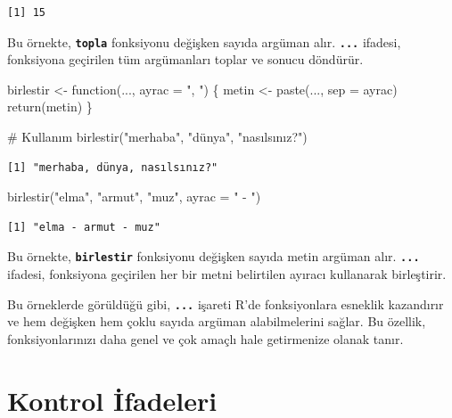 \documentclass[
  letterpaper,
  DIV=11,
  numbers=noendperiod]{scrreprt}
\newenvironment{Shaded}{\begin{snugshade}}{\end{snugshade}}
\newcommand{\AttributeTok}[1]{\textcolor[rgb]{0.40,0.45,0.13}{#1}}
\newcommand{\CommentTok}[1]{\textcolor[rgb]{0.37,0.37,0.37}{#1}}
\newcommand{\ControlFlowTok}[1]{\textcolor[rgb]{0.00,0.23,0.31}{#1}}
\newcommand{\FunctionTok}[1]{\textcolor[rgb]{0.28,0.35,0.67}{#1}}
\newcommand{\NormalTok}[1]{\textcolor[rgb]{0.00,0.23,0.31}{#1}}
\newcommand{\OtherTok}[1]{\textcolor[rgb]{0.00,0.23,0.31}{#1}}
\newcommand{\StringTok}[1]{\textcolor[rgb]{0.13,0.47,0.30}{#1}}
\begin{document}
\begin{verbatim}
[1] 15
\end{verbatim}

Bu örnekte, \textbf{\texttt{topla}} fonksiyonu değişken sayıda argüman
alır. \textbf{\texttt{...}} ifadesi, fonksiyona geçirilen tüm
argümanları toplar ve sonucu döndürür.

\begin{Shaded}
\begin{Highlighting}[]
\NormalTok{birlestir }\OtherTok{\textless{}{-}} \ControlFlowTok{function}\NormalTok{(..., }\AttributeTok{ayrac =} \StringTok{", "}\NormalTok{) \{}
\NormalTok{  metin }\OtherTok{\textless{}{-}} \FunctionTok{paste}\NormalTok{(..., }\AttributeTok{sep =}\NormalTok{ ayrac)}
  \FunctionTok{return}\NormalTok{(metin)}
\NormalTok{\}}

\CommentTok{\# Kullanım}
\FunctionTok{birlestir}\NormalTok{(}\StringTok{"merhaba"}\NormalTok{, }\StringTok{"dünya"}\NormalTok{, }\StringTok{"nasılsınız?"}\NormalTok{)  }
\end{Highlighting}
\end{Shaded}

\begin{verbatim}
[1] "merhaba, dünya, nasılsınız?"
\end{verbatim}

\begin{Shaded}
\begin{Highlighting}[]
\FunctionTok{birlestir}\NormalTok{(}\StringTok{"elma"}\NormalTok{, }\StringTok{"armut"}\NormalTok{, }\StringTok{"muz"}\NormalTok{, }\AttributeTok{ayrac =} \StringTok{" {-} "}\NormalTok{)}
\end{Highlighting}
\end{Shaded}

\begin{verbatim}
[1] "elma - armut - muz"
\end{verbatim}

Bu örnekte, \textbf{\texttt{birlestir}} fonksiyonu değişken sayıda metin
argüman alır. \textbf{\texttt{...}} ifadesi, fonksiyona geçirilen her
bir metni belirtilen ayıracı kullanarak birleştirir.

Bu örneklerde görüldüğü gibi, \textbf{\texttt{...}} işareti R'de
fonksiyonlara esneklik kazandırır ve hem değişken hem çoklu sayıda
argüman alabilmelerini sağlar. Bu özellik, fonksiyonlarınızı daha genel
ve çok amaçlı hale getirmenize olanak tanır.

\chapter{Kontrol İfadeleri}\label{kontrol-ifadeleri}
\end{document}
